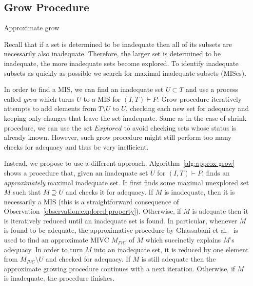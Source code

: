 \subsection{Grow Procedure}

%
%
 
\begin{algorithm}[!t]
\label{alg:approx-grow}

\caption{Approximate grow}
\end{algorithm}

Recall that if a set is determined to be inadequate then all of its subsets are necessarily also inadequate. Therefore, the larger set is determined to be inadequate, the more inadequate sets become explored.  %
To identify inadequate subsets as quickly as possible we search for maximal inadequate subsets (MISes).  

In order to find a MIS, we can find an inadequate set $U \subset T$ and use a process called \emph{grow} which turns $U$ to a MIS for $(I,T) \vdash P$.
Grow procedure iteratively attempts to add elements from $T \setminus U$ to $U$, checking each new set for adequacy and keeping only changes that leave the set inadequate. Same as in the case of shrink procedure, we can use the set $Explored$ to avoid checking sets whose status is already known.
However, such grow procedure might still perform too many checks for adequacy and thus be very inefficient. 


Instead, we propose to use a different approach. Algorithm~\ref{alg:approx-grow} shows a procedure that, given an inadequate set $U$ for $(I, T) \vdash P$, finds an \emph{approximately} maximal inadequate set. 
It first finds some maximal unexplored set $M$ such that $M \supseteq U$ and checks it for adequacy. 
If $M$ is inadequate, then it is necessarily a MIS
(this is a straightforward consequence of Observation~\ref{observation:explored-property}). 
Otherwise, if $M$ is adequate then it is iteratively reduced until an inadequate set is found.
In particular, whenever $M$ is found to be adequate, the approximative procedure by Ghassabani et al.~\cite{single-mivc} is used to find an approximate MIVC $M_{IVC}$ of $M$ which succinctly explains $M$'s adequacy. In order to turn $M$ into an inadequate set, it is reduced by one element from $M_{IVC} \setminus U$ and checked for adequacy. If $M$ is still adequate then the approximate growing procedure continues with a next iteration. Otherwise, if $M$ is inadequate, the procedure finishes.

